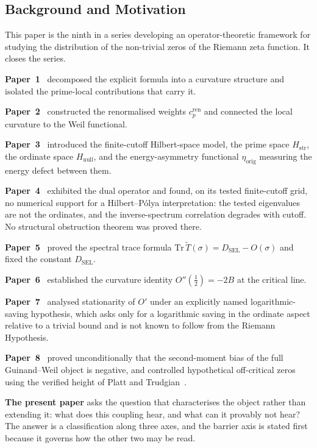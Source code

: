 \documentclass[11pt]{article}
\newcommand{\Hstr}{H_{\mathrm{str}}}
\newcommand{\Hnull}{H_{\mathrm{null}}}
\newcommand{\Tt}{\widetilde{T}}
\newcommand{\DSEL}{D_{\mathrm{SEL}}}
\begin{document}
\subsection{Background and Motivation}

This paper is the ninth in a series developing an operator-theoretic framework
for studying the distribution of the non-trivial zeros of the Riemann zeta
function. It closes the series.

\textbf{Paper~1}~\cite{Paper1} decomposed the explicit formula into a
curvature structure and isolated the prime-local contributions that carry it.

\textbf{Paper~2}~\cite{Paper2} constructed the renormalised weights
$c_p^{\mathrm{ren}}$ and connected the local curvature to the Weil functional.

\textbf{Paper~3}~\cite{Paper3} introduced the finite-cutoff Hilbert-space
model, the prime space $\Hstr$, the ordinate space $\Hnull$, and the
energy-asymmetry functional $\eta_{\mathrm{orig}}$ measuring the energy defect
between them.

\textbf{Paper~4}~\cite{Paper4} exhibited the dual operator and found, on
its tested finite-cutoff grid, no numerical support for a Hilbert--P\'olya
interpretation: the tested eigenvalues are not the ordinates, and the
inverse-spectrum correlation degrades with cutoff. No structural
obstruction theorem was proved there.

\textbf{Paper~5}~\cite{Paper5} proved the spectral trace formula
$\mathrm{Tr}\,\Tt(\sigma)=\DSEL-O(\sigma)$ and fixed the constant $\DSEL$.

\textbf{Paper~6}~\cite{Paper6} established the curvature identity
$O''(\tfrac12)=-2B$ at the critical line.

\textbf{Paper~7}~\cite{Paper7} analysed stationarity of $O'$ under an
explicitly named logarithmic-saving hypothesis, which asks only for a
logarithmic saving in the ordinate aspect relative to a trivial bound and is
not known to follow from the Riemann Hypothesis.

\textbf{Paper~8}~\cite{Paper8} proved unconditionally that the second-moment
bias of the full Guinand--Weil object is negative, and controlled hypothetical
off-critical zeros using the verified height of Platt and
Trudgian~\cite{PlattTrudgian21}.

\textbf{The present paper} asks the question that characterises the object
rather than extending it: what does this coupling hear, and what can it
provably not hear? The answer is a classification along three axes, and the
barrier axis is stated first because it governs how the other two may be read.
\end{document}
